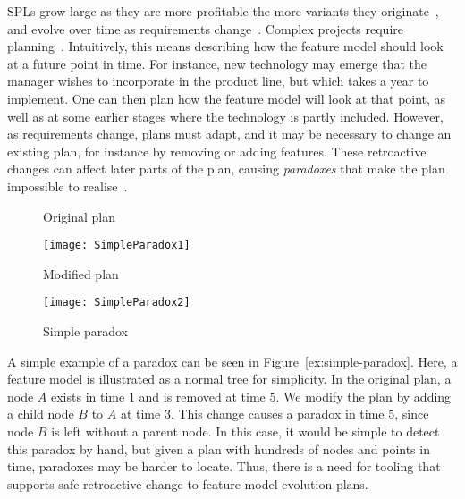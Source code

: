 SPLs grow large as they are more profitable the more variants they originate~\cite{book:introduction-to-spl}, %
and evolve over time as requirements change~\cite{art:context-aware-reconfiguration-in-evolving-software-product-lines, art:darwinspl-an-integrated-tool-suite-for-modeling-evolving-context-aware-software-product-lines}. Complex projects require planning~\cite{art:evofm-feature-driven-planning-of-product-line-evolution}. Intuitively, this means describing how the feature model should look at a future point in time. For instance, new technology may emerge that the manager wishes to incorporate in the product line, but which takes a year to implement. One can then plan how the feature model will look at that point, as well as at some earlier stages where the technology is partly included. However, as requirements change, plans must adapt, and it may be necessary to change an existing plan, for instance by removing or adding features. These retroactive changes can affect later parts of the plan, causing \emph{paradoxes} that make the plan impossible to realise~\cite{art:anomaly-detection-and-explanation-in-context-aware-software-product-lines}. 

\begin{figure}
   \begin{centering}
      \begin{minipage}[t]{0.42\textwidth}
         \vspace{0pt}
         \small
         \begin{center}
            Original plan
         \end{center}
         \texttt{[image: SimpleParadox1]}
      \end{minipage}\hfill
      \begin{minipage}[t]{0.56\textwidth}
         \vspace{0pt}
         \small
          \begin{center}
             Modified plan
          \end{center} 
         \texttt{[image: SimpleParadox2]}
      \end{minipage}
   \end{centering}
   \caption{Simple paradox}
   \label{ex:simple-paradox}
\end{figure}

A simple example of a paradox can be seen in Figure~\vref{ex:simple-paradox}. Here, a feature model is illustrated as a normal tree for simplicity. In the original plan, a node $A$ exists in time $1$ and is removed at time $5$. We modify the plan by adding a child node $B$ to $A$ at time $3$. This change causes a paradox in time $5$, since node $B$ is left without a parent node. In this case, it would be simple to detect this paradox by hand, but given a plan with hundreds of nodes and points in time, paradoxes may be harder to locate.  Thus, there is a need for tooling that supports safe retroactive change to feature model evolution plans. 

